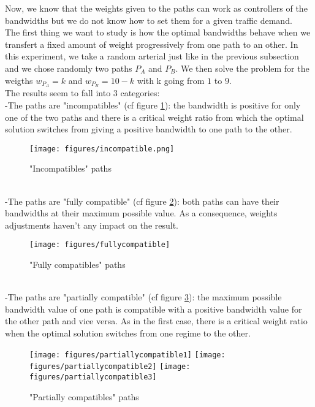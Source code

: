 Now, we know that the weights given to the paths can work as controllers of the bandwidths but we do not know how to set them for a given traffic demand.\\
The first thing we want to study is how the optimal bandwidths behave when we transfert a fixed amount of weight progressively from one path to an other. In this experiment, we take a random arterial just like in the previous subsection and we chose randomly two paths $P_A$ and $P_B$. We then solve the problem for the weigths $w_{P_A} = k$ and $w_{P_B} = 10 - k$ with k going from $1$ to $9$.\\
The results seem to fall into $3$ categories:\\
-The paths are "incompatibles" (cf figure \ref{incompatible}): the bandwidth is positive for only one of the two paths and there is a critical weight ratio from which the optimal solution switches from giving a positive bandwidth to one path to the other.\\
\begin{figure}[!h]
\centering
\texttt{[image: figures/incompatible.png]}
\caption{"Incompatibles" paths}
\label{incompatible}
\end{figure} \\
-The paths are "fully compatible" (cf figure \ref{fullycompatible}): both paths can have their bandwidths at their maximum possible value. As a consequence, weights adjustments haven't any impact on the result.\\
\begin{figure}[!h]
\centering
\texttt{[image: figures/fullycompatible]}
\caption{"Fully compatibles" paths}
\label{fullycompatible}
\end{figure} \\
-The paths are "partially compatible" (cf figure \ref{partiallycompatible}): the maximum possible bandwidth value of one path is compatible with a positive bandwidth value for the other path and vice versa. As in the first case, there is a critical weight ratio when the optimal solution switches from one regime to the other.\\
\begin{figure}[!h]
\centering
\texttt{[image: figures/partiallycompatible1]}
\texttt{[image: figures/partiallycompatible2]}
\texttt{[image: figures/partiallycompatible3]}
\caption{"Partially compatibles" paths}
\label{partiallycompatible}
\end{figure}
\\
